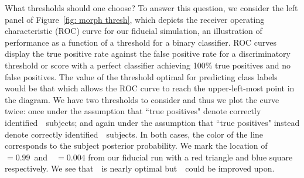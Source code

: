 What thresholds should one choose? To answer this question, we consider the left panel of Figure~\ref{fig: morph thresh}, which depicts the receiver operating characteristic (ROC) curve for our fiducial simulation, an illustration of performance as a function of a threshold for a binary classifier. ROC curves display the true positive rate against the false positive rate for a discriminatory threshold or score with a perfect classifier achieving 100\% true positives and no false positives. The value of the threshold optimal for predicting class labels would be that which allows the ROC curve to reach the upper-left-most point in the diagram. We have two thresholds to consider and thus we plot the curve twice: once under the assumption that ``true positives" denote correctly identified~\feat~subjects; and again under the assumption that ``true positives" instead denote correctly identified~\notfeat~subjects.  In both cases, the color of the line corresponds to the subject posterior probability. We mark the location of~\tf~$=0.99$~and~\tn~$=0.004$
from our fiducial run with a red triangle and blue square respectively. We see that~\tf~is nearly optimal but~\tn~could be improved upon. 